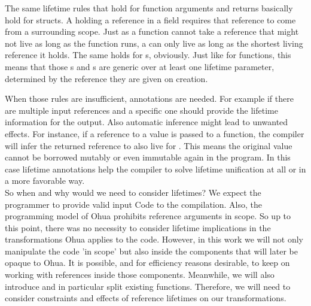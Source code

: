 The same lifetime rules that hold for function arguments and returns basically hold for structs. A  holding a reference in a field requires that reference to come from a surrounding scope. Just as a function cannot take a reference that might not live as long as the function runs, a  can only live as long as the shortest living reference it holds. The same holds for s, obviously. Just like for functions, this means that those s and s are generic over at least one lifetime parameter, determined by the reference they are given on creation.

When those rules are insufficient, annotations are needed. For example if there are multiple input references and a specific one should provide the lifetime information for the output. Also automatic inference might lead to unwanted effects. For instance, if a reference to a  value is passed to a function, the compiler will infer the returned reference to also live for . This means the original value cannot be borrowed mutably or even immutable again in the program. In this case lifetime annotations help the compiler to solve lifetime unification at all or in a more favorable way. \\

So when and why would we need to consider lifetimes? We expect the programmer to provide valid input Code to the compilation. Also, the programming model of Ohua prohibits reference arguments in scope. So up to this point, there was no necessity to consider lifetime implications in the transformations Ohua applies to the code. However, in this work we will not only manipulate the code 'in scope' but also inside the components that will later be opaque to Ohua. It is possible, and for efficiency reasons desirable, to keep on working with references inside those components. Meanwhile, we will also introduce and in particular split existing functions. Therefore, we will need to consider constraints and effects of reference lifetimes on our transformations.




